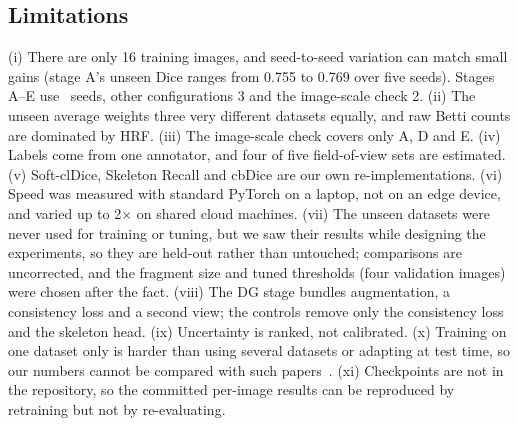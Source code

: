 \documentclass[conference]{IEEEtran}
\begin{document}
\subsection{Limitations}\label{sec:limits}
(i) There are only 16 training images, and seed-to-seed variation can match small gains (stage A's unseen Dice ranges from 0.755 to 0.769 over five seeds). Stages A--E use \nSeeds\ seeds, other configurations 3 and the image-scale check 2. (ii) The unseen average weights three very different datasets equally, and raw Betti counts are dominated by HRF. (iii) The image-scale check covers only A, D and E. (iv) Labels come from one annotator, and four of five field-of-view sets are estimated. (v) Soft-clDice, Skeleton Recall and cbDice are our own re-implementations. (vi) Speed was measured with standard PyTorch on a laptop, not on an edge device, and varied up to 2$\times$ on shared cloud machines. (vii) The unseen datasets were never used for training or tuning, but we saw their results while designing the experiments, so they are held-out rather than untouched; comparisons are uncorrected, and the fragment size and tuned thresholds (four validation images) were chosen after the fact. (viii) The DG stage bundles augmentation, a consistency loss and a second view; the controls remove only the consistency loss and the skeleton head. (ix) Uncertainty is ranked, not calibrated. (x) Training on one dataset only is harder than using several datasets or adapting at test time, so our numbers cannot be compared with such papers~\cite{liu2026dgssa,wang2026wavernet,zhou2025}. (xi) Checkpoints are not in the repository, so the committed per-image results can be reproduced by retraining but not by re-evaluating.

\end{document}

